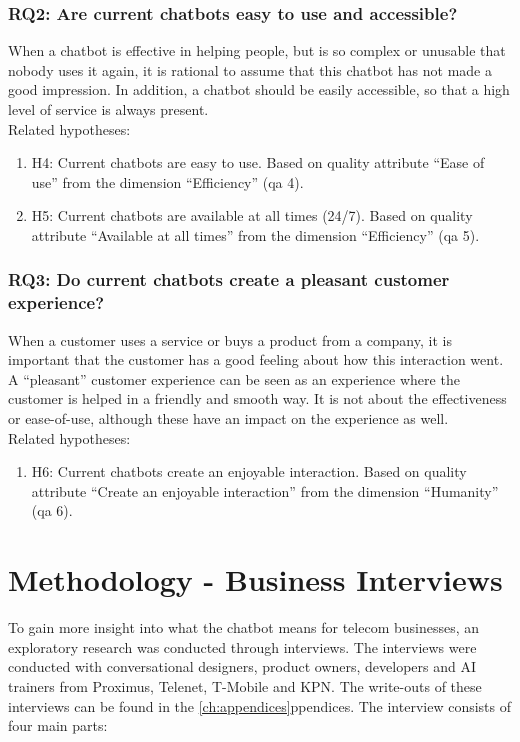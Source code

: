 \subsubsection{RQ2: Are current chatbots easy to use and accessible?}
When a chatbot is effective in helping people, but is so complex or unusable that nobody uses it again, it is rational to assume that this chatbot has not made a good impression. In addition, a chatbot should be easily accessible, so that a high level of service is always present.\\
\break
\break
Related hypotheses:
\begin{enumerate}
	\setlength\itemsep{-0.1em}
	\item H4: Current  chatbots are easy to use. Based on \citeauthor{Verkeyn2018} quality attribute “Ease of use” from the dimension “Efficiency” (\acrshort{qa} 4).
	\item H5: Current  chatbots are available at all times (24/7). Based on \citeauthor{Verkeyn2018} quality attribute “Available at all times” from the dimension “Efficiency” (\acrshort{qa} 5).
\end{enumerate}

\subsubsection{RQ3: Do current chatbots create a pleasant customer experience?}
When a customer uses a service or buys a product from a company, it is important that the customer has a good feeling about how this interaction went.\\
\break
A “pleasant” customer experience can be seen as an experience where the customer is helped in a friendly and smooth way. It is not about the effectiveness or ease-of-use, although these have an impact on the experience as well. \\
\break
\break
Related hypotheses:
\begin{enumerate}
	\setlength\itemsep{-0.1em}
	\item H6: Current chatbots create an enjoyable interaction. Based on \citeauthor{Verkeyn2018} quality attribute “Create an enjoyable interaction” from the dimension “Humanity” \citep{Morrissey2013} (\acrshort{qa} 6).
\end{enumerate}

\section{Methodology - Business Interviews}
To gain more insight into what the chatbot means for telecom businesses, an exploratory research was conducted through interviews. The interviews were conducted with conversational designers, product owners, developers and AI trainers from Proximus, Telenet, T-Mobile and KPN. The write-outs of these interviews can be found in the \ref{ch:appendices}ppendices. The interview consists of four main parts:

